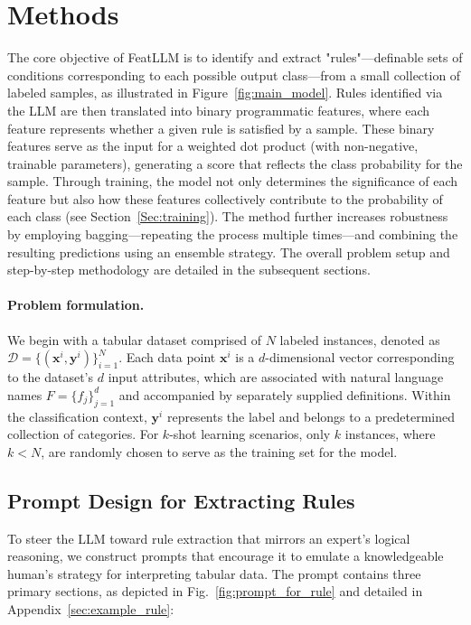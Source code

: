\section{Methods}
The core objective of \textsf{FeatLLM} is to identify and extract "rules"—definable sets of conditions corresponding to each possible output class—from a small collection of labeled samples, as illustrated in Figure~\ref{fig:main_model}. Rules identified via the LLM are then translated into binary programmatic features, where each feature represents whether a given rule is satisfied by a sample. These binary features serve as the input for a weighted dot product (with non-negative, trainable parameters), generating a score that reflects the class probability for the sample. Through training, the model not only determines the significance of each feature but also how these features collectively contribute to the probability of each class (see Section~\ref{Sec:training}). The method further increases robustness by employing bagging—repeating the process multiple times—and combining the resulting predictions using an ensemble strategy. The overall problem setup and step-by-step methodology are detailed in the subsequent sections.

\vspace*{-0.12in}
\paragraph{Problem formulation.} We begin with a tabular dataset comprised of $N$ labeled instances, denoted as $\mathcal{D} = \{(\mathbf{x}^i, \mathbf{y}^i)\}_{i=1}^{N}$. Each data point $\mathbf{x}^i$ is a $d$-dimensional vector corresponding to the dataset's $d$ input attributes, which are associated with natural language names $F = \{f_j\}_{j=1}^{d}$ and accompanied by separately supplied definitions. Within the classification context, $\mathbf{y}^i$ represents the label and belongs to a predetermined collection of categories. For $k$-shot learning scenarios, only $k$ instances, where $k < N$, are randomly chosen to serve as the training set for the model. 

\subsection{Prompt Design for Extracting Rules}
\label{Sec:prompt_design}
To steer the LLM toward rule extraction that mirrors an expert's logical reasoning, we construct prompts that encourage it to emulate a knowledgeable human's strategy for interpreting tabular data. The prompt contains three primary sections, as depicted in Fig.~\ref{fig:prompt_for_rule} and detailed in Appendix~\ref{sec:example_rule}:

